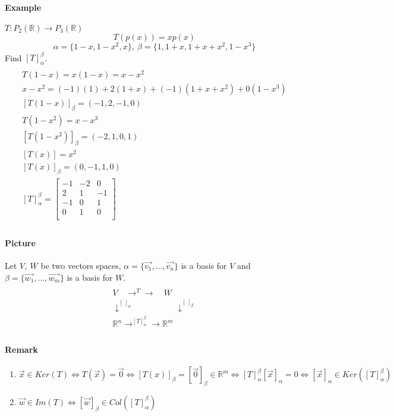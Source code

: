 \documentclass[11pt]{article}
\begin{document}
	\paragraph{Example} $T:P_2(\mathbb{R}) \to P_3(\mathbb{R})$ 
	\[
		T(p(x)) = xp(x) 
	\]
	\[
	\alpha = \{1-x, 1-x^2, x\},\ \beta = \{1, 1+x, 1+x+x^2, 1-x^3\}
	\]
	Find $[T]_{\alpha}^{\beta}$.
	\begin{multline*}
		\\
		T(1-x) = x(1-x) = x - x^2 \\
		x - x^2 = (-1)(1) + 2(1+x) + (-1)(1+x+x^2) + 0(1-x^3) \\
		[T(1-x)]_{\beta} = (-1,2,-1,0) \\
		T(1-x^2) = x - x^3\\
		[T(1-x^2)]_{\beta} = (-2, 1, 0, 1)\\
		[T(x)] = x^2 \\
		[T(x)]_{\beta} = (0,-1,1,0)\\
		[T]_{\alpha}^{\beta} = \begin{bmatrix}
			-1 & -2 & 0 \\
			2 & 1 & -1 \\
			-1 & 0 & 1 \\
			0 & 1 & 0\\
		\end{bmatrix}
		\\
	\end{multline*}
	
	\paragraph{Picture}Let $V,\ W$ be two vectors spaces, $\alpha = \{ \vec{v_1}, \dots, 
	\vec{v_n} \}$ is a basis for $V$ and $\beta = \{ \vec{w_1}, \dots, 
	\vec{w_m} \}$ is a basis for $W$.
	\begin{multline*}
	\\
		V \quad \longrightarrow^{T} \longrightarrow \quad W \\
		\downarrow^{[\ ]_{\alpha}} \quad \quad \quad \quad \quad \downarrow^{[\ ]_{\beta}} \\
		\mathbb{R}^n \longrightarrow^{[T]_{\alpha}^{\beta}}\longrightarrow \mathbb{R}^m \\
	\end{multline*}
	
	\paragraph{Remark}
	\begin{enumerate}
		\item $\vec{x} \in Ker(T) \iff T(\vec{x}) = \vec{0} \iff [T(x)]_{\beta} = [\vec{0}]_{\beta} \in \mathbb{R}^m \iff [T]_{\alpha}^{\beta} [\vec{x}]_{\alpha} = 0 \iff [\vec{x}]_{\alpha} \in Ker([T]_{\alpha}^{\beta})$
		\item $\vec{w} \in Im(T) \iff [\vec{w}]_{\beta} \in Col([T]_{\alpha}^{\beta})$
	\end{enumerate}
\end{document}
